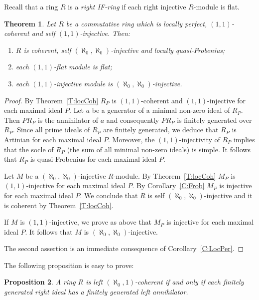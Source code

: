 \documentclass{amsart}
\newtheorem{theorem}{Theorem}[section]
\newtheorem{proposition}[theorem]{Proposition}
\begin{document}
Recall that a ring $R$ is a {\it right IF-ring} if each right injective $R$-module is flat.
\begin{theorem}
\label{T:LocPerIF} Let $R$ be a commutative ring which is locally perfect, $(1,1)$-coherent and self $(1,1)$-injective. Then:
\begin{enumerate}
\item $R$ is coherent, self $(\aleph_0,\aleph_0)$-injective and  locally quasi-Frobenius;
\item each $(1,1)$-flat module is flat;
\item each $(1,1)$-injective module is $(\aleph_0,\aleph_0)$-injective.
\end{enumerate}
\end{theorem}
\begin{proof}
By Theorem~\ref{T:locCoh} $R_P$ is $(1,1)$-coherent and $(1,1)$-injective for each maximal ideal $P$. Let $a$ be a generator of a minimal non-zero ideal of $R_P$. Then $PR_P$ is the annihilator of $a$ and consequently $PR_P$ is finitely generated over $R_P$. Since all prime ideals of $R_P$ are finitely generated, we deduce that $R_P$ is Artinian for each maximal ideal $P$. Moreover, the $(1,1)$-injectivity of $R_P$ implies that the socle of $R_P$ (the sum of all minimal non-zero ideals) is simple. It follows that $R_P$ is quasi-Frobenius for each maximal ideal $P$.

Let $M$ be a $(\aleph_0,\aleph_0)$-injective $R$-module. By Theorem~\ref{T:locCoh} $M_P$ is  $(1,1)$-injective for each maximal ideal $P$. By Corollary~\ref{C:Frob} $M_P$ is injective for each maximal ideal $P$. We conclude that $R$ is self $(\aleph_0,\aleph_0)$-injective and it is coherent by Theorem~\ref{T:locCoh}.

If $M$ is $(1,1)$-injective, we prove as above that $M_P$ is injective for each maximal ideal $P$. It follows that $M$ is $(\aleph_0,\aleph_0)$-injective.

The second assertion is an immediate consequence of Corollary~\ref{C:LocPer}.
\end{proof}


The following proposition is easy to prove:
\begin{proposition}
\label{P:1coh} A ring $R$ is left $(\aleph_0,1)$-coherent if and only if each finitely generated right ideal has a  finitely generated left annihilator.
\end{proposition}
\end{document}
